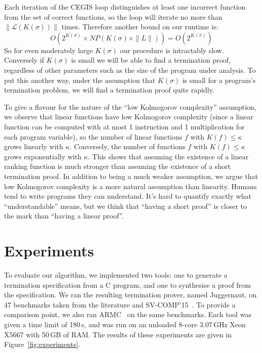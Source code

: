 \documentclass[preprint]{sigplanconf}
\theoremstyle{definition}
\begin{document}
Each iteration of the CEGIS loop distinguishes at least one incorrect function from the set of correct
functions, so the loop will iterate no more than $\| \mathcal{L}(K(\sigma)) \|$ times.
Therefore another bound on our runtime is:
$$O\left (2^{K(\sigma)} \times NP \left ( K(\sigma) \times \| L \| \right) \right) = O \left(2^{K(\sigma)} \right)$$
So for even moderately large $K(\sigma)$ our procedure is intractably slow.  Conversely
if $K(\sigma)$ is small we will be able to find a termination proof, regardless of other parameters
such as the size of the program under analysis.  To put this another way, under the assumption
that $K(\sigma)$ is small for a program's termination problem, we will find a termination proof
quite rapidly.

To give a flavour for the nature of the ``low Kolmogorov complexity'' assumption, 
we observe that linear functions have low Kolmogorov complexity (since a linear function can
be computed with at most 1 instruction and 1 multiplication for each program variable),
so the number of linear functions $f$ with $K(f) \leq \kappa$ grows linearly with $\kappa$.
Conversely, the number of functions $f$ with $K(f) \leq \kappa$
grows exponentially with $\kappa$.  This shows that assuming the existence of a linear
ranking function is much stronger than assuming the existence of a short
termination proof.  In addition to being a much weaker assumption,
we argue that low Kolmogorov complexity is a more natural assumption than
linearity.  Humans tend to write programs they can understand.  It's hard
to quantify exactly what ``understandable'' means, but we think that
``having a short proof'' is closer to the mark than ``having a linear proof''.


\section{Experiments}

To evaluate our algorithm, we implemented two tools: one to generate a
termination specification from a C program, and one to synthesise a proof
from the specification.  We ran the resulting termination prover,
named {\sc Juggernaut}, on 47
benchmarks taken from the literature and SV-COMP'15~\cite{svcomp15}.  To
provide a comparison point, we also ran {\sc ARMC}~\cite{armc-website} on
the same benchmarks.  Each tool was given a time limit of 180\,s, and was
run on an unloaded 8-core 3.07\,GHz Xeon X5667 with 50\,GB of RAM.  The
results of these experiments are given in Figure~\ref{fig:experiments}.
\end{document}

